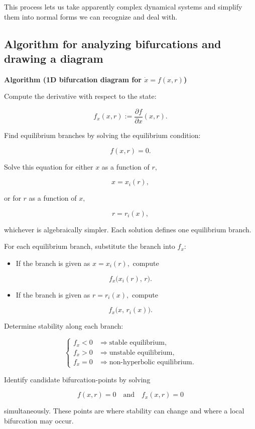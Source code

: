 \documentclass{article}
\begin{document}
This process lets us take apparently complex dynamical systems and simplify them into normal forms we can recognize and deal with.

\subsection{Algorithm for analyzing bifurcations and drawing a diagram}

\textbf{Algorithm (1D bifurcation diagram for $\dot{x} = f(x,r)$)}

Compute the derivative with respect to the state:

\[ f_x(x,r) := \frac{\partial f}{\partial x}(x,r). \]

Find equilibrium branches by solving the equilibrium condition:

\[ f(x,r) = 0. \]

Solve this equation for either $x$ as a function of $r,$

\[ x = x_i(r), \]

or for $r$ as a function of $x,$

\[ r = r_i(x), \]

whichever is algebraically simpler. Each solution defines one equilibrium branch.

For each equilibrium branch, substitute the branch into $f_x$:

\begin{itemize}
\item If the branch is given as $x = x_i(r),$ compute
\end{itemize}

\[ f_x\bigl(x_i(r),\, r\bigr). \]

\begin{itemize}
\item If the branch is given as $r = r_i(x),$ compute
\end{itemize}

\[ f_x\bigl(x,\, r_i(x)\bigr). \]

Determine stability along each branch:

\[ \begin{cases} f_x < 0 & \Rightarrow \text{stable equilibrium}, \\ f_x > 0 & \Rightarrow \text{unstable equilibrium}, \\ f_x = 0 & \Rightarrow \text{non-hyperbolic equilibrium}. \end{cases} \]

Identify candidate \@{bifurcation-points} by solving

\[ f(x,r) = 0 \quad \text{and} \quad f_x(x,r) = 0 \]

simultaneously. These points are where stability can change and where a local bifurcation may occur.
\end{document}
